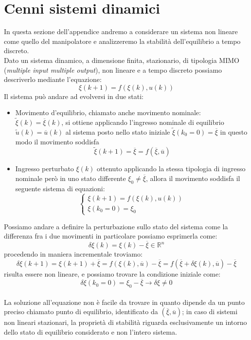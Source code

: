 \section{Cenni sistemi dinamici}
In questa sezione dell'appendice  andremo a considerare un sistema non lineare come quello del manipolatore e analizzeremo la stabilità dell'equilibrio a tempo discreto.
\\Dato un sistema dinamico, a dimensione finita, stazionario, di tipologia MIMO (\textit{multiple input multiple output}), non lineare e a tempo discreto possiamo descriverlo mediante l'equazione:
\begin{equation}
\xi(k+1) = f(\xi(k),u(k))
\end{equation}
Il sistema può andare ad evolversi in due stati:
\begin{itemize}
\item Movimento d'equilibrio, chiamato anche movimento nominale: $\tilde{\xi}(k) = \overline{\xi}(k)$, si ottiene applicando l'ingresso nominale di equilibrio $\tilde{u}(k) = \overline{u}(k)$ al sistema posto nello stato iniziale $\tilde{\xi}(k_0 = 0)=\overline{\xi}$ in questo modo il movimento soddisfa
\begin{equation}
\tilde{\xi}(k+1) = \overline{\xi} = f(\overline{\xi},\overline{u})
\end{equation}
\item Ingresso perturbato $\xi(k)$ ottenuto applicando la stessa tipologia di ingresso nominale però in uno stato differente $\xi_0 \neq \overline{\xi}$, allora il movimento soddisfa il seguente sistema di equazioni:
\begin{equation}
\begin{cases}
\xi(k+1) = f(\xi(k),u(k)) \\
\xi(k_0=0) = \xi_0
\end{cases}
\end{equation}
\end{itemize}
Possiamo andare a definire la perturbazione sullo stato del sistema come la differenza fra i due movimenti in particolare possiamo esprimerla come:
\begin{equation}
\delta \xi(k) = \xi(k)-\overline{\xi} \in \mathbb{R}^n 
\end{equation}
procedendo in maniera incrementale troviamo:
\begin{equation}
\delta \xi(k+1) = \xi(k+1)+\overline{\xi} = f(\xi(k),\overline{u})-\overline{\xi} = f(\overline{\xi}+\delta\xi(k),\overline{u})-\overline{\xi}
\end{equation}
risulta essere non lineare, e possiamo trovare la condizione iniziale come:
\begin{equation*} 
\delta \xi(k_0 = 0) = \xi_0 -\overline{\xi} \rightarrow \delta \xi \neq 0
\end{equation*}
\\La soluzione all'equazione non è facile da trovare in quanto dipende da un punto preciso chiamato punto di equilibrio, identificato da $(\overline{\xi},\overline{u})$; in caso di sistemi non lineari stazionari, la proprietà di stabilità riguarda esclusivamente un intorno dello stato di equilibrio considerato e non l'intero sistema.
